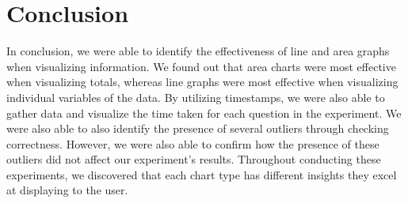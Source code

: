 \section{Conclusion}
\quad In conclusion, we were able to identify the effectiveness of line and area graphs when visualizing information. We found out that area charts were most effective when visualizing totals, whereas line graphs were most effective when visualizing individual variables of the data. By utilizing timestamps, we were also able to gather data and visualize the time taken for each question in the experiment. We were also able to also identify the presence of several outliers through checking correctness. However, we were also able to confirm how the presence of these outliers did not affect our experiment's results. Throughout conducting these experiments, we discovered that each chart type has different insights they excel at displaying to the user.